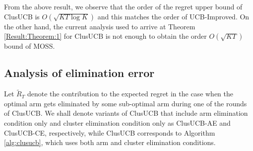 From the above result, we observe that the order of the regret upper bound of ClusUCB is $O(\sqrt{KT\log K})$ and this matches the order of UCB-Improved. On the other hand, the current analysis used to arrive at Theorem \ref{Result:Theorem:1} for ClusUCB is not enough to obtain the order $O(\sqrt{KT})$ bound of MOSS.


% 
%
%
%
%
%

\subsection*{Analysis of elimination error}
Let $\tilde R_T$ denote the contribution  to the expected regret in the case when the optimal arm gets eliminated by some sub-optimal arm during one of the rounds of ClusUCB. 
We shall denote variants of ClusUCB that include arm elimination condition only and cluster elimination condition only as ClusUCB-AE and ClusUCB-CE, respectively, while ClusUCB corresponds to Algorithm \ref{alg:clusucb}, which uses both arm and cluster elimination conditions.

